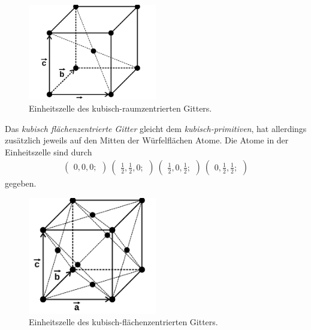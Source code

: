 \begin{figure}[hhh]
\centering
\includegraphics[width=0.5\textwidth]{abbildungen/bcc.png}
\caption{Einheitszelle des kubisch-raumzentrierten Gitters.\cite{sample}}
\label{fig:bcc}
\end{figure}

Das \textit{kubisch flächenzentrierte Gitter} gleicht dem
\textit{kubisch-primitiven}, hat
allerdings zusätzlich jeweils auf den Mitten der Würfelflächen Atome.
Die Atome in der Einheitszelle sind durch
\begin{align}
\label{eqn:3*}
\begin{pmatrix}
0, 0, 0;
\end{pmatrix}\
\begin{pmatrix}
\frac{1}{2}, \frac{1}{2}, 0;
\end{pmatrix}\
\begin{pmatrix}
\frac{1}{2}, 0, \frac{1}{2};
\end{pmatrix}\
\begin{pmatrix}
0, \frac{1}{2}, \frac{1}{2};
\end{pmatrix}
\end{align}
gegeben.

\begin{figure}[hhh]
\centering
\includegraphics[width=0.5\textwidth]{abbildungen/fcc.png}
\caption{Einheitszelle des kubisch-flächenzentrierten Gitters.\cite{sample}}
\label{fig:fcc}
\end{figure}

